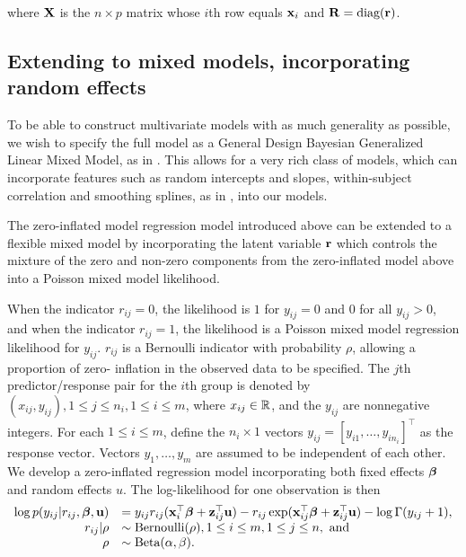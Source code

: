 \noindent where ${\bf X}$ is the $n\times p$ matrix whose $i$th row equals ${\bf x}_i$
and ${\bf R} = \text{diag}{({\bf r})}$.

\subsection{Extending to mixed models, incorporating random effects}

To be able to construct multivariate models with as much generality as
possible, we wish to specify the full model as a General Design Bayesian
Generalized Linear Mixed Model, as in \cite{Zhao2006}. This allows for a very
rich class of models, which can incorporate features such as random intercepts
and slopes, within-subject correlation and smoothing splines, as in
\cite{Wand2008}, into our models.

The zero-inflated model regression model introduced above can be extended to a
flexible mixed model by incorporating the latent variable ${\bf r}$ which controls
the mixture of the zero and non-zero components from the zero-inflated model
above into a Poisson mixed model likelihood.

When the indicator $r_{ij} = 0$, the likelihood is $1$ for $y_{ij} = 0$ and $0$
for all $y_{ij} > 0$, and when the indicator $r_{ij} = 1$, the likelihood is a
Poisson mixed model regression likelihood for $y_{ij}$.  $r_{ij}$ is a
Bernoulli indicator with probability $\rho$, allowing a proportion of zero-
inflation in the observed data to be specified. The $j$th predictor/response
pair for the $i$th group is denoted by $(x_{ij}, y_{ij}), 1 \leq j \leq n_i, 1
\leq i \leq m$, where $x_{ij} \in {\mathbb{R}}$, and the $y_{ij}$ are nonnegative
integers. For each $1 \leq i \leq m$, define the $n_i \times 1$ vectors $y_{ij}
= [y_{i 1}, \ldots, y_{i n_i}]^\top$ as the response vector. Vectors $y_1,
\ldots, y_m$ are assumed to be independent of each other.  We develop a
zero-inflated regression model incorporating both fixed effects ${\boldsymbol \beta}$ and
random effects $u$. The log-likelihood for one observation is then
\begin{equation*}
	\begin{array}{rl}
		\log p(y_{ij} | r_{ij}, {\boldsymbol \beta}, {\bf u}) & = y_{ij} r_{ij} ({\bf x}_i^\top {\boldsymbol\beta} + {\bf z}_{ij}^\top {\bf u}) - r_{ij} \exp ({\bf x}_{ij}^\top {\boldsymbol\beta} + {\bf z}_{ij}^\top {\bf u}) - \log \Gamma (y_{ij} + 1), \\
		r_{ij} | \rho                  & \sim \text{Bernoulli}(\rho), 1 \leq i \leq m, 1 \leq j \leq n, \text{ and }                                                              \\
		\rho                        & \sim \text{Beta}(\alpha, \beta).                                                                                              \\
	\end{array}
\end{equation*}

